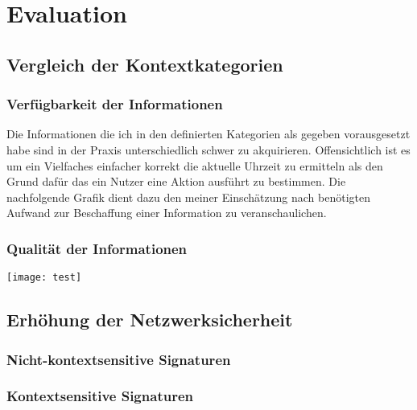 \chapter{Evaluation}%
\label{cha:evaluation}



\section{Vergleich der Kontextkategorien} 
\subsection{Verfügbarkeit der Informationen}
Die Informationen die ich in den definierten Kategorien als gegeben vorausgesetzt habe sind in der Praxis unterschiedlich schwer zu akquirieren. Offensichtlich ist es um ein Vielfaches einfacher korrekt die aktuelle Uhrzeit zu ermitteln als den Grund dafür das ein Nutzer eine Aktion ausführt zu bestimmen. Die nachfolgende Grafik dient dazu den meiner Einschätzung nach benötigten Aufwand zur Beschaffung einer Information zu veranschaulichen.
\subsection{Qualität der Informationen}

\texttt{[image: test]}

\section{Erhöhung der Netzwerksicherheit}
\subsection{Nicht-kontextsensitive Signaturen}
\subsection{Kontextsensitive Signaturen} 
